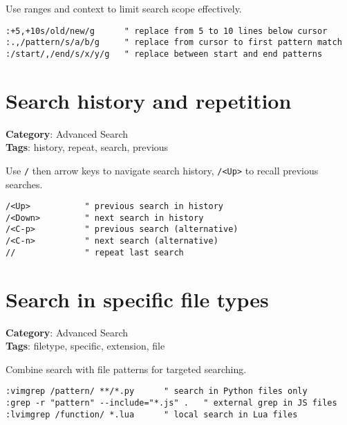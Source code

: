 {Use ranges and context to limit search scope effectively.

\begin{Exa*}{}
\begin{Verbatim}[fontsize=\footnotesize, breaklines, breakanywhere]
:+5,+10s/old/new/g      " replace from 5 to 10 lines below cursor
:.,/pattern/s/a/b/g     " replace from cursor to first pattern match
:/start/,/end/s/x/y/g   " replace between start and end patterns
\end{Verbatim}
\end{Exa*}

\section{Search history and repetition}

\textbf{Category}: Advanced Search\\ \textbf{Tags}: history, repeat, search, previous
\vspace{0.5cm}

Use {\footnotesize \Verb§/§} then arrow keys to navigate search history, {\footnotesize \Verb§/<Up>§} to recall previous searches.

\begin{Exa*}{}
\begin{Verbatim}[fontsize=\footnotesize, breaklines, breakanywhere]
/<Up>           " previous search in history
/<Down>         " next search in history
/<C-p>          " previous search (alternative)
/<C-n>          " next search (alternative)
//              " repeat last search
\end{Verbatim}
\end{Exa*}

\section{Search in specific file types}

\textbf{Category}: Advanced Search\\ \textbf{Tags}: filetype, specific, extension, file
\vspace{0.5cm}

Combine search with file patterns for targeted searching.

\begin{Exa*}{}
\begin{Verbatim}[fontsize=\footnotesize, breaklines, breakanywhere]
:vimgrep /pattern/ **/*.py      " search in Python files only
:grep -r "pattern" --include="*.js" .   " external grep in JS files
:lvimgrep /function/ *.lua      " local search in Lua files
\end{Verbatim}
\end{Exa*}

}
